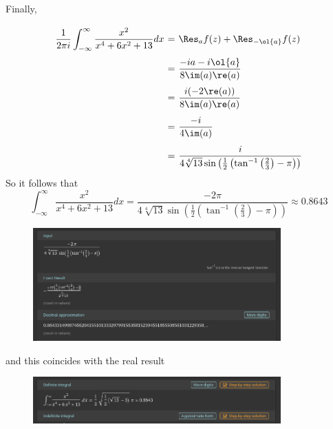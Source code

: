 Finally,
\[ \everymath{\displaystyle}
\arraycolsep=1.8pt\def\arraystretch{2.5}
\begin{array}{rcl}
    \frac{1}{2\pi i}\int_{-\infty}^{\infty} \frac{x^2}{x^{4} + 6x^{2}+13} dx & = & \Res_a f(z) + \Res_{-\ol{a}} f(z)\\
    & = & \frac{-ia - i\ol{a}}{8\im(a)\re(a)}\\
    & = & \frac{i(-2 \re(a))}{8\im(a)\re(a)}\\
    & = & \frac{-i}{4 \im(a)}\\
    & = & \frac{i}{4 \sqrt[4]{13} \sin\left( \frac{1}{2}\left( \tan^{-1}\left( \frac{2}{3} \right) - \pi  \right) \right)}\\
\end{array} \]
So it follows that 
\[ \int_{-\infty}^{\infty} \frac{x^2}{x^{4} + 6x^{2}+13} dx = \frac{-2\pi}{4 \sqrt[4]{13} \sin\left( \frac{1}{2}\left( \tan^{-1}\left( \frac{2}{3} \right) - \pi  \right) \right)} \approx 0.8643 \]
\begin{figure}[H]
    \centering
    \includegraphics[width=0.85\textwidth]{../pictures/image1.png}
\end{figure}
and this coincides with the real result
\begin{figure}[H]
    \centering
    \includegraphics[width=0.85\textwidth]{../pictures/image2.png}
\end{figure}

